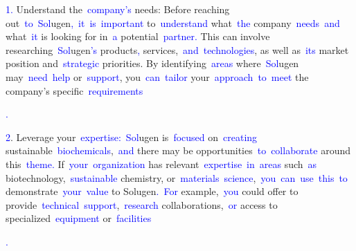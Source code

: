 \documentclass{article}
\begin{document}
\begin{tcolorbox}[colframe=black,colback=white]
{}\textcolor{blue}{1}\textcolor{blue}{.} Understand the\textcolor{blue}{~company}\textcolor{blue}{'s} needs: Before reaching out\textcolor{blue}{~to}\textcolor{blue}{~Sol}ugen\textcolor{blue}{,}\textcolor{blue}{~it}\textcolor{blue}{~is}\textcolor{blue}{~important} to\textcolor{blue}{~understand} what\textcolor{blue}{~the} company\textcolor{blue}{~needs}\textcolor{blue}{~and} what\textcolor{blue}{~it} is looking for in\textcolor{blue}{~a} potential\textcolor{blue}{~partner}\textcolor{blue}{.} This can involve researching\textcolor{blue}{~Sol}ugen\textcolor{blue}{'s} products\textcolor{blue}{,} services,\textcolor{blue}{~and}\textcolor{blue}{~technologies}, as well as\textcolor{blue}{~its} market position and\textcolor{blue}{~strategic} priorities. By identifying\textcolor{blue}{~areas} where\textcolor{blue}{~Sol}ugen may\textcolor{blue}{~need}\textcolor{blue}{~help} or\textcolor{blue}{~support}, you\textcolor{blue}{~can}\textcolor{blue}{~tailor} your\textcolor{blue}{~approach}\textcolor{blue}{~to}\textcolor{blue}{~meet} the company's specific\textcolor{blue}{~requirements}\textcolor{blue}{.

}\textcolor{blue}{2}. Leverage your\textcolor{blue}{~expertise}\textcolor{blue}{:}\textcolor{blue}{~Sol}ugen is\textcolor{blue}{~focused} on\textcolor{blue}{~creating} sustainable\textcolor{blue}{~biochemical}\textcolor{blue}{s},\textcolor{blue}{~and} there may be opportunities\textcolor{blue}{~to}\textcolor{blue}{~collaborate} around this\textcolor{blue}{~theme}\textcolor{blue}{.} If\textcolor{blue}{~your}\textcolor{blue}{~organization} has relevant\textcolor{blue}{~expertise}\textcolor{blue}{~in}\textcolor{blue}{~areas} such\textcolor{blue}{~as} biotechnology,\textcolor{blue}{~sustainable} chemistry, or\textcolor{blue}{~materials}\textcolor{blue}{~science},\textcolor{blue}{~you}\textcolor{blue}{~can}\textcolor{blue}{~use}\textcolor{blue}{~this}\textcolor{blue}{~to} demonstrate\textcolor{blue}{~your}\textcolor{blue}{~value} to Solugen\textcolor{blue}{.}\textcolor{blue}{~For} example,\textcolor{blue}{~you} could offer to provide\textcolor{blue}{~technical}\textcolor{blue}{~support},\textcolor{blue}{~research} collaborations,\textcolor{blue}{~or} access to specialized\textcolor{blue}{~equipment} or\textcolor{blue}{~facilities}\textcolor{blue}{.

}
\end{tcolorbox}
\end{document}
